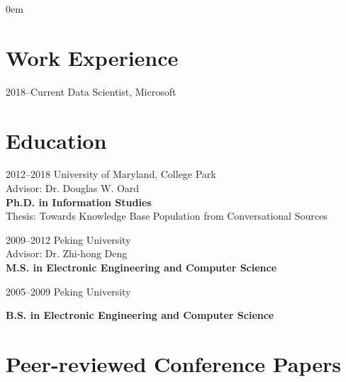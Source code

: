 \documentclass[a4paper, 11pt]{article}
\begin{document}
\large
\parindent 0em
\thispagestyle{myheadings}

   \makecvtitle


\section{Work Experience}
\begin{CV}
\item[2018--Current]  Data Scientist, Microsoft\\ 
\end{CV}
\vspace{-3mm}

\section{Education}

\begin{CV}
\item[2012--2018] University of Maryland, College Park\\
Advisor: Dr. Douglas W. Oard\\
\textbf{Ph.D. in Information Studies}\\
Thesis: Towards Knowledge Base Population from Conversational Sources
\vspace{2mm}

\item[2009--2012] Peking University\\
 Advisor: Dr. Zhi-hong Deng\\
\textbf{M.S. in Electronic Engineering and Computer Science}
\vspace{2mm}

\item[2005--2009] Peking University

\textbf{B.S. in Electronic Engineering and Computer Science}
\end{CV}
\vspace{-1mm}







\vspace{-1mm}
\section{Peer-reviewed Conference Papers}
\end{document}
